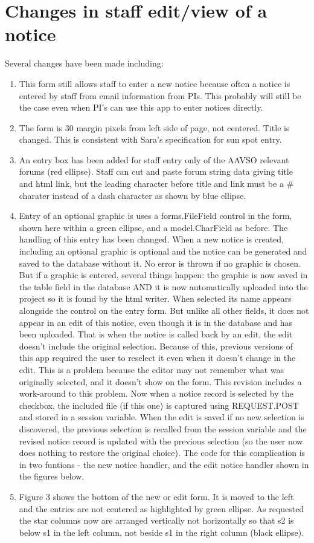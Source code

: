 \documentclass[11pt]{article}
\begin{document}
\section{Changes in staff edit/view of a notice}
Several changes have been made including:
\begin{enumerate}
	\item This form still allows staff to enter a new notice because often a notice is entered by staff from email information from PIs. This probably will still be the case even when PI's can use this app to enter notices directly.
	\item The form is 30 margin pixels from left side of page, not centered. Title is changed. This is consistent with Sara's specification for sun spot entry.   
    \item An entry box has been added for staff entry only of the AAVSO relevant forums (red ellipse). Staff can cut and paste forum string data giving title and html link, but the leading character before title and link must be a \# charater instead of a dash character as shown by blue ellipse.   
		\item Entry of an optional graphic is uses a  forms.FileField control in the form, shown here within a green ellipse, and a model.CharField  as before. The handling of this entry has been changed. When a new notice is created, including an optional graphic is optional and the notice can be generated and saved to the database without it. No error is thrown if no graphic is chosen. But if a graphic is entered, several things happen: the graphic is now saved in the table field in the database AND it is now automatically uploaded into the project so it is found by the html writer. When selected its name appears alongside the control on the entry form. But unlike all other fields, it does not appear in an edit of this notice, even though it is in the database and has been uploaded. That is when the notice is called back by an edit, the edit doesn't include the original selection. Because of this, previous versions of this app required the user to reselect it even when it doesn't change in the edit. This is a problem because the editor may not remember what was originally selected, and it doesn't show on the form. This revision includes a work-around to this problem. Now when a notice record is selected by the checkbox, the included file (if this one) is captured using REQUEST.POST and stored in a session variable. When the edit is saved if no new selection is discovered, the previous selection is recalled from the session variable and the revised notice record is updated with the previous selection (so the user now does nothing to restore the original choice). The code for this complication is in two funtions - the new notice handler, and the edit notice handler shown in the figures below.   
	\item Figure 3 shows the bottom of the new or edit form. It is moved to the left and the entries are not centered as highlighted by green ellipse. As requested the star columns now are arranged vertically not horizontally so that s2 is below s1 in the left column, not beside s1 in the right column (black ellipse). 
\end{enumerate}   
\end{document}
